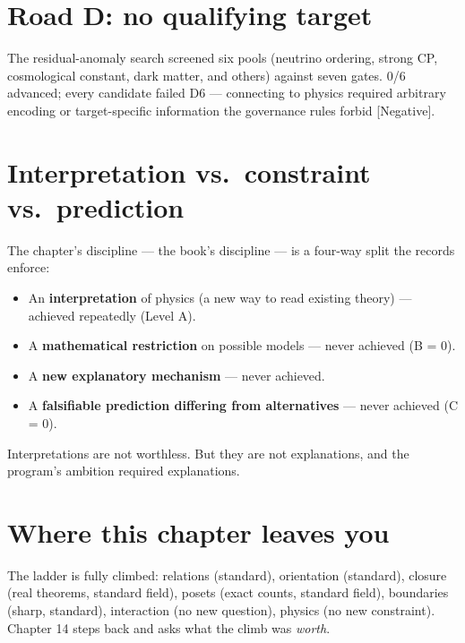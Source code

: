 \documentclass[
  11pt,
]{book}
\providecommand{\tightlist}{%
  \setlength{\itemsep}{0pt}\setlength{\parskip}{0pt}}
\begin{document}
\section{Road D: no qualifying
target}\label{road-d-no-qualifying-target}

The residual-anomaly search screened six pools (neutrino ordering,
strong CP, cosmological constant, dark matter, and others) against seven
gates. 0/6 advanced; every candidate failed D6 --- connecting to physics
required arbitrary encoding or target-specific information the
governance rules forbid {[}Negative{]}.

\section{Interpretation vs.~constraint
vs.~prediction}\label{interpretation-vs.-constraint-vs.-prediction}

The chapter's discipline --- the book's discipline --- is a four-way
split the records enforce:

\begin{itemize}
\tightlist
\item
  An \textbf{interpretation} of physics (a new way to read existing
  theory) --- achieved repeatedly (Level A).
\item
  A \textbf{mathematical restriction} on possible models --- never
  achieved (B = 0).
\item
  A \textbf{new explanatory mechanism} --- never achieved.
\item
  A \textbf{falsifiable prediction differing from alternatives} ---
  never achieved (C = 0).
\end{itemize}

Interpretations are not worthless. But they are not explanations, and
the program's ambition required explanations.

\section{Where this chapter leaves
you}\label{where-this-chapter-leaves-you-11}

The ladder is fully climbed: relations (standard), orientation
(standard), closure (real theorems, standard field), posets (exact
counts, standard field), boundaries (sharp, standard), interaction (no
new question), physics (no new constraint). Chapter 14 steps back and
asks what the climb was \emph{worth}.

\newpage
\end{document}
